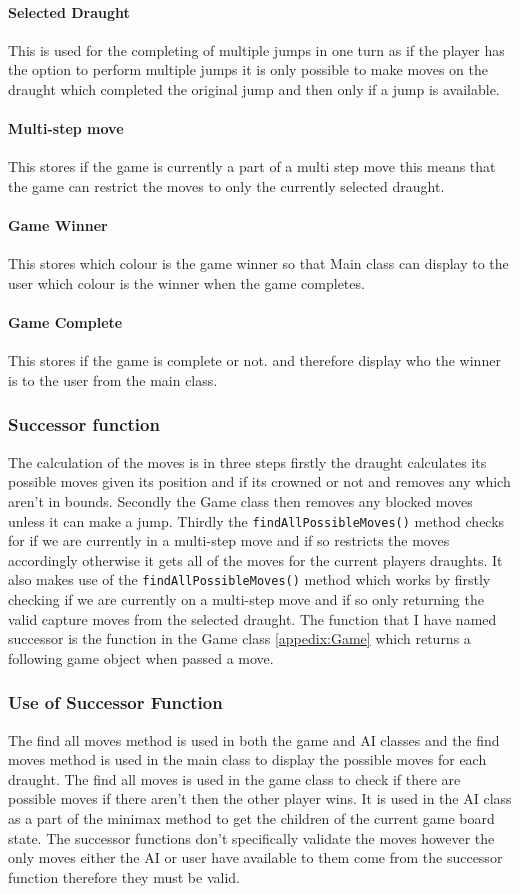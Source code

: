 \documentclass[a4paper,12pt]{scrartcl}
\begin{document}
{{{				\paragraph{Selected Draught}
				{
					This is used for the completing of multiple jumps in one turn as if the player has the option to perform multiple jumps it is only possible to make moves on the draught which completed the original jump and then only if a jump is available.
				}
				\paragraph{Multi-step move}
				{
					This stores if the game is currently a part of a multi step move this means that the game can restrict the moves to only the currently selected draught.
				}
				\paragraph{Game Winner}
				{
					This stores which colour is the game winner so that Main class can display to the user which colour is the winner when the game completes. 
				}
				\paragraph{Game Complete}
				{
					This stores if the game is complete or not. and therefore display who the winner is to the user from the main class.
				}
			}
			\subsubsection{Successor function}{
				The calculation of the moves is in three steps firstly the draught calculates its possible moves given its position and if its crowned or not and removes any which aren't in bounds.
				Secondly the Game class then removes any blocked moves unless it can make a jump.
				Thirdly the \lstinline|findAllPossibleMoves()| method checks for if we are currently in a multi-step move and if so restricts the moves accordingly otherwise it gets all of the moves for the current players draughts.
				It also makes use of the \lstinline|findAllPossibleMoves()| method which works by firstly checking if we are currently on a multi-step move and if so only returning the valid capture moves from the selected draught.
				The function that I have named successor is the function in the Game class \cref{appedix:Game} which returns a following game object when passed a move.
			}
			\subsubsection{Use of Successor Function}{
				The find all moves method is used in both the game and AI classes and the find moves method is used in the main class to display the possible moves for each draught. The find all moves is used in the game class to check if there are possible moves if there aren't then the other player wins.
				It is used in the AI class as a part of the minimax method to get the children of the current game board state. The successor functions don't specifically validate the moves however the only moves either the AI or user have available to them come from the successor function therefore they must be valid.
			}
}}
\end{document}
